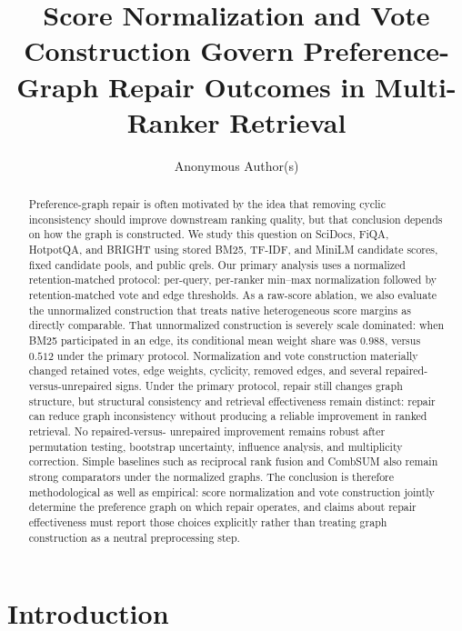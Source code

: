 \documentclass[manuscript,anonymous,review]{acmart}
\title{Score Normalization and Vote Construction Govern Preference-Graph
  Repair Outcomes in Multi-Ranker Retrieval}
\author{Anonymous Author(s)}
\affiliation{%
  \institution{Institution redacted for review}
  \country{}
}
\begin{document}
\begin{abstract}
Preference-graph repair is often motivated by the idea that removing cyclic
inconsistency should improve downstream ranking quality, but that conclusion
depends on how the graph is constructed. We study this question on SciDocs,
FiQA, HotpotQA, and BRIGHT using stored BM25, TF-IDF, and MiniLM candidate
scores, fixed candidate pools, and public qrels. Our primary analysis uses a
normalized retention-matched protocol: per-query, per-ranker min--max
normalization followed by retention-matched vote and edge thresholds. As a
raw-score ablation, we also evaluate the unnormalized construction that
treats native heterogeneous score margins as directly comparable. That
unnormalized construction is severely scale dominated: when BM25 participated
in an edge, its conditional mean weight share was $0.988$, versus $0.512$
under the primary protocol. Normalization and vote construction materially
changed retained votes, edge weights, cyclicity, removed edges, and several
repaired-versus-unrepaired signs. Under the primary protocol, repair still
changes graph structure, but structural consistency and retrieval
effectiveness remain distinct: repair can reduce graph inconsistency without
producing a reliable improvement in ranked retrieval. No repaired-versus-
unrepaired improvement remains robust after permutation testing, bootstrap
uncertainty, influence analysis, and multiplicity correction. Simple baselines
such as reciprocal rank fusion and CombSUM also remain strong comparators
under the normalized graphs. The conclusion is therefore methodological as
well as empirical: score normalization and vote construction jointly determine
the preference graph on which repair operates, and claims about repair
effectiveness must report those choices explicitly rather than treating graph
construction as a neutral preprocessing step.
\end{abstract}

\maketitle

\section{Introduction}
\label{sec:introduction}
\end{document}
